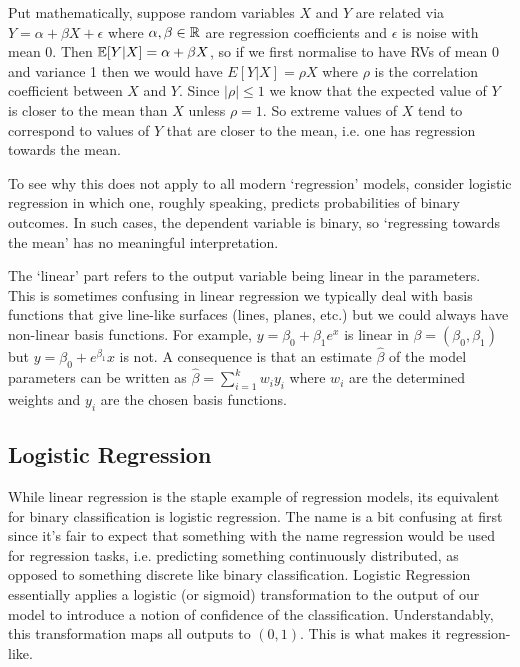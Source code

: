 \documentclass[11pt]{article}
\begin{document}
Put mathematically, suppose random variables $X$ and $Y$ are related via $Y=\alpha+\beta X+\epsilon$ where $\alpha,\beta\in\mathbb{R}$ are regression coefficients and $\epsilon$ is noise with mean $0$. Then $\mathbb{E}[Y|X]=\alpha+\beta X$, so if we first normalise to have RVs of mean 0 and variance 1 then we would have $E[Y|X]=\rho X$ where $\rho$ is the correlation coefficient between $X$ and $Y$. Since $|\rho|\leq1$ we know that the expected value of $Y$ is closer to the mean than $X$ unless $\rho=1$. So extreme values of $X$ tend to correspond to values of $Y$ that are closer to the mean, i.e. one has regression towards the mean.

To see why this does not apply to all modern `regression' models, consider logistic regression in which one, roughly speaking, predicts probabilities of binary outcomes. In such cases, the dependent variable is binary, so `regressing towards the mean' has no meaningful interpretation.

The `linear' part refers to the output variable being linear in the parameters. This is sometimes confusing in linear regression we typically deal with basis functions that give line-like surfaces (lines, planes, etc.) but we could always have non-linear basis functions. For example, $y=\beta_0+\beta_1 e^x$ is linear in $\beta=(\beta_0,\beta_1)$ but $y=\beta_0+e^{\beta_1}x$ is not. A consequence is that an estimate $\hat{\beta}$ of the model parameters can be written as $\hat{\beta}=\sum_{i=1}^k w_iy_i$ where $w_i$ are the determined weights and $y_i$ are the chosen basis functions.

\subsection{Logistic Regression}

While linear regression is the staple example of regression models, its equivalent for binary classification is logistic regression. The name is a bit confusing at first since it's fair to expect that something with the name regression would be used for regression tasks, i.e. predicting something continuously distributed, as opposed to something discrete like binary classification. Logistic Regression essentially applies a logistic (or sigmoid) transformation to the output of our model to introduce a notion of confidence of the classification. Understandably, this transformation maps all outputs to $(0,1)$. This is what makes it regression-like.
\end{document}
